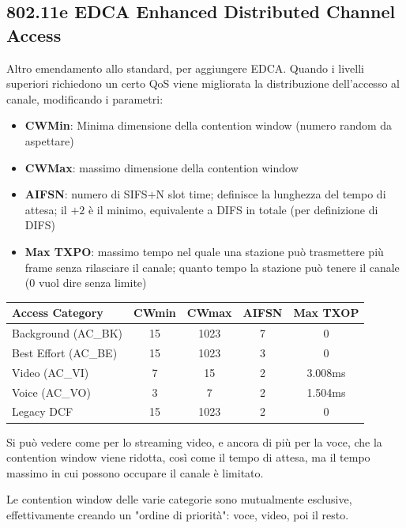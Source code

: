 \subsection{802.11e EDCA Enhanced Distributed Channel Access}

Altro emendamento allo standard, per aggiungere EDCA. Quando i livelli superiori richiedono un certo QoS viene migliorata la distribuzione dell'accesso al canale, modificando i parametri:
\begin{itemize}
	\item \textbf{CWMin}: Minima dimensione della contention window (numero random da aspettare)

	\item \textbf{CWMax}: massimo dimensione della contention window

	\item \textbf{AIFSN}: numero di SIFS$+$N slot time; definisce la lunghezza del tempo di attesa; il $+2$ è il minimo, equivalente a DIFS in totale (per definizione di DIFS)

	\item \textbf{Max TXPO}: massimo tempo nel quale una stazione può trasmettere più frame senza rilasciare il canale; quanto tempo la stazione può tenere il canale (0 vuol dire senza limite)
\end{itemize}

\begin{tabular}{|l|c|c|c|c|}
	\hline
	\textbf{Access Category} & \textbf{CWmin} & \textbf{CWmax} & \textbf{AIFSN} & \textbf{Max TXOP} \\ 
	\hline
	Background (AC\_BK) & 15 & 1023 & 7 & 0 \\ 
	\hline
	Best Effort (AC\_BE) & 15 & 1023 & 3 & 0 \\ 
	\hline
	Video (AC\_VI) & 7 & 15 & 2 & 3.008ms \\ 
	\hline
	Voice (AC\_VO) & 3 & 7 & 2 & 1.504ms \\ 
	\hline
	Legacy DCF & 15 & 1023 & 2 & 0 \\ 
	\hline
\end{tabular}

Si può vedere come per lo streaming video, e ancora di più per la voce, che la contention window viene ridotta, così come il tempo di attesa, ma il tempo massimo in cui possono occupare il canale è limitato. 

Le contention window delle varie categorie sono mutualmente esclusive, effettivamente creando un "ordine di priorità": voce, video, poi il resto.

